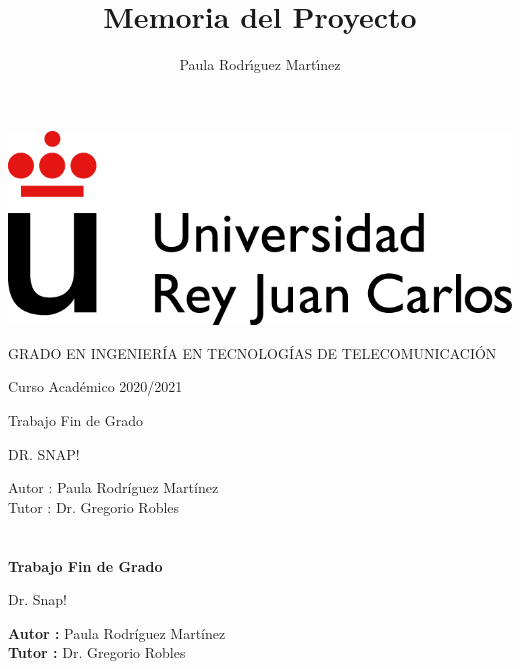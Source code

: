 \documentclass[a4paper, 12pt]{book}
\title{Memoria del Proyecto}
\author{Paula Rodrı́guez Martı́nez}
\begin{document}
\renewcommand{\refname}{Bibliografía}  %
\renewcommand{\appendixname}{Apéndice}


\begin{titlepage}
\begin{center}
\includegraphics[scale=0.8]{img/URJ_logo_Color_POS.png}

\vspace{1.75cm}

\Large
GRADO EN INGENIERÍA EN TECNOLOGÍAS DE TELECOMUNICACIÓN

\vspace{0.4cm}

\large
Curso Académico 2020/2021

\vspace{0.8cm}

Trabajo Fin de Grado

\vspace{2.5cm}

\LARGE
DR. SNAP!

\vspace{4cm}

\large
Autor : Paula Rodríguez Martínez \\
Tutor : Dr. Gregorio Robles
\end{center}
\end{titlepage}

\newpage
\mbox{}
\thispagestyle{empty} %


\clearpage
{}
\chapter*{}

\vspace{-4cm}
\begin{center}
\LARGE
\textbf{Trabajo Fin de Grado}

\vspace{1cm}
\large
Dr. Snap!

\vspace{1cm}
\large
\textbf{Autor :} Paula Rodríguez Martínez \\
\textbf{Tutor :} Dr. Gregorio Robles\\

\end{center}
\end{document}
